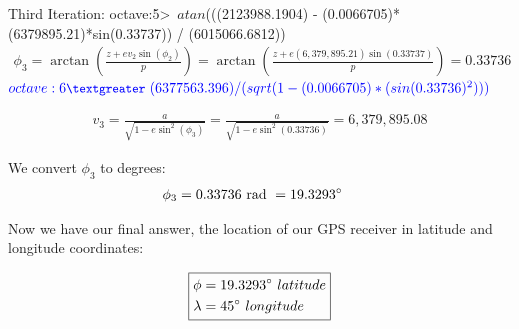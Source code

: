\documentclass{article}
\begin{document}
\vspace{5mm}
Third Iteration: \newline \break  
\textnormal{\color{blue} \small octave:5\textgreater \ $atan$(((2123988.1904) - (0.0066705)*(6379895.21)*sin(0.33737)) / (6015066.6812)) \normalsize}
\begin{align*}
    \phi_3 = \arctan(\frac{z + e v_{2}\sin(\phi_{2})}{p}) = \arctan(\frac{z + e(6,379,895.21)\sin(0.33737)}{p}) = 0.33736
\end{align*} 
\textnormal{$\color{blue} \small octave:6\textgreater \ (6377563.396) / (sqrt(1 - (0.0066705)*(sin(0.33736)^2)))$ \normalsize}

\begin{align*}
    v_3 = \frac{a}{\sqrt{1 - e\sin^{2}(\phi_3)}} = \frac{a}{\sqrt{1 - e\sin^{2}(0.33736)}} = 6,379,895.08
\end{align*}

\vspace{5mm}
\noindent We convert $\phi_{3}$ to degrees:
\begin{align*}
            \phi_3 & = 0.33736 \ \textnormal{rad} \ = 19.3293\degree
\end{align*}

\vspace{5mm}
\noindent Now we have our final answer, the location of our GPS receiver in latitude and longitude coordinates:

\[
 \boxed{\begin{align*}
    \phi & = 19.3293\degree \ latitude \\
            \lambda & = 45\degree \ longitude \end{align*}}
 \]
\end{document}
